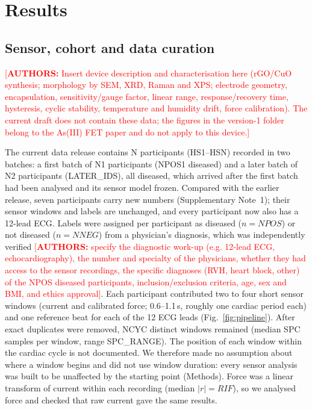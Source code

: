 \documentclass[11pt]{article}
\newcommand{\authnote}[1]{\textcolor{red}{[\textbf{AUTHORS:} #1]}}
\begin{document}
\section*{Results}

\subsection*{Sensor, cohort and data curation}
\authnote{Insert device description and characterisation here (rGO/CuO synthesis; morphology by SEM, XRD, Raman and XPS; electrode geometry, encapsulation, sensitivity/gauge factor, linear range, response/recovery time, hysteresis, cyclic stability, temperature and humidity drift, force calibration). The current draft does not contain these data; the figures in the version-1 folder belong to the As(III) FET paper and do not apply to this device.}

The current data release contains {{N}} participants (HS1--HS{{N}}) recorded in two batches: a first batch of {{N1}} participants ({{NPOS1}} diseased) and a later batch of {{N2}} participants ({{LATER_IDS}}), all diseased, which arrived after the first batch had been analysed and its sensor model frozen. Compared with the earlier release, seven participants carry new numbers (Supplementary Note~1); their sensor windows and labels are unchanged, and every participant now also has a 12-lead ECG. Labels were assigned per participant as diseased ($n={{NPOS}}$) or not diseased ($n={{NNEG}}$) from a physician's diagnosis, which was independently verified \authnote{specify the diagnostic work-up (e.g. 12-lead ECG, echocardiography), the number and specialty of the physicians, whether they had access to the sensor recordings, the specific diagnoses (RVH, heart block, other) of the {{NPOS}} diseased participants, inclusion/exclusion criteria, age, sex and BMI, and ethics approval}. Each participant contributed two to four short sensor windows (current and calibrated force; 0.6--1.1\,s, roughly one cardiac period each) and one reference beat for each of the 12 ECG leads (Fig.~\ref{fig:pipeline}). After exact duplicates were removed, {{NCYC}} distinct windows remained (median {{SPC}} samples per window, range {{SPC_RANGE}}). The position of each window within the cardiac cycle is not documented. We therefore made no assumption about where a window begins and did not use window duration: every sensor analysis was built to be unaffected by the starting point (Methods). Force was a linear transform of current within each recording (median $|r|={{RIF}}$), so we analysed force and checked that raw current gave the same results.
\end{document}

